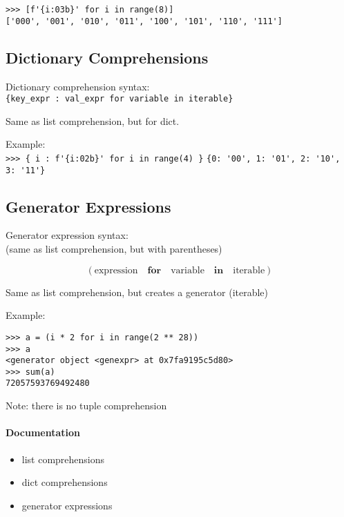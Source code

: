 \documentclass[12pt]{article}
\begin{document}
\verb|>>> [f'{i:03b}' for i in range(8)]|\\
\verb|['000', '001', '010', '011', '100', '101', '110', '111']|

\subsection{Dictionary Comprehensions}

Dictionary comprehension syntax:\\
\verb|{key_expr : val_expr for variable in iterable}|

Same as list comprehension, but for dict.

Example:\\
\verb|>>> { i : f'{i:02b}' for i in range(4) }|
\verb|{0: '00', 1: '01', 2: '10', 3: '11'}|


\subsection{Generator Expressions}

Generator expression syntax: \\
(same as list comprehension, but with parentheses)

\begin{equation*}
(\text{expression} \quad \textbf{for} \quad \text{variable} \quad \textbf{in} \quad \text{iterable} )
\end{equation*}

Same as list comprehension, but creates a generator (iterable)

Example:

\begin{verbatim}
>>> a = (i * 2 for i in range(2 ** 28))
>>> a
<generator object <genexpr> at 0x7fa9195c5d80>
>>> sum(a)
72057593769492480
\end{verbatim}

Note: there is no tuple comprehension

\paragraph{Documentation}
\begin{itemize}
    \item list comprehensions
    \item dict comprehensions
    \item generator expressions
\end{itemize}
\end{document}
